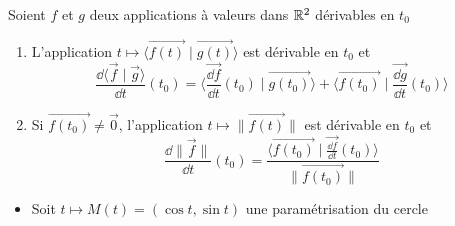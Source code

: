 \begin{frame}
Soient $f$ et $g$ deux applications à valeurs dans $\mathbb{R}^2$ dérivables en $t_0$

\begin{theoreme}

\pause
\begin{enumerate}
\item L'application 
$t\mapsto \big\langle \overrightarrow{f(t)} \mid \overrightarrow{g(t)} \big\rangle$ 
est dérivable en $t_0$ et 
$$\frac{\dd \big\langle \overrightarrow{f} \mid \overrightarrow{g} \big\rangle}{\dd t}(t_0)
=\big\langle \overrightarrow{\frac{\dd f}{\dd t}}(t_0) \mid \overrightarrow{g(t_0)}\big\rangle+
\big\langle \overrightarrow{f(t_0)} \mid \overrightarrow{\frac{\dd g}{\dd t}}(t_0)\big\rangle$$ 
\pause

\item Si $\overrightarrow{f(t_0)}\neq\vec{0}$, l'application 
$t\mapsto\|\overrightarrow{f(t)}\|$ est dérivable en $t_0$ et
$$\frac{\dd\|\overrightarrow{f}\|}{\dd t}(t_0)
=\frac{\big\langle \overrightarrow{f(t_0)} \mid 
\overrightarrow{\frac{\dd f}{\dd t}}(t_0)\big\rangle}{\|\overrightarrow{f(t_0)}\|}$$
\end{enumerate}
\end{theoreme}

\end{frame}


\begin{frame}
\begin{exemple}
\begin{itemize}
  \item Soit  $t\mapsto M(t)=(\cos t,\sin t)$ une paramétrisation du cercle 
\end{itemize}

\vspace*{-3ex}
\end{exemple}
\end{frame}




